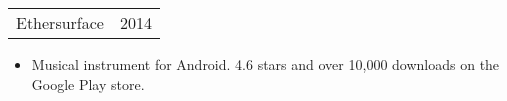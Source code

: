 \documentclass[margin]{res}
\begin{document}
\begin{resume}
\begin{tabular}{p{3in} r} %
Ethersurface &  2014
\end{tabular}	
\begin{itemize} %
\item[] Musical instrument for Android. 4.6 stars and over 10,000 downloads
on the Google Play store.
\end{itemize} 

\end{resume} 
\end{document}
